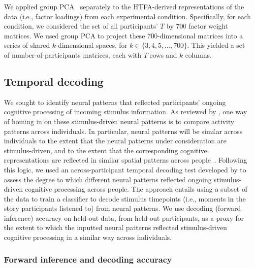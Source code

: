 \documentclass[english, 11pt]{article}
\begin{document}
We applied group PCA~\citep{SmitEtal14} separately to the HTFA-derived
representations of the data (i.e., factor loadings) from each experimental
condition. Specifically, for each condition, we considered the set of all
participants' $T$ by 700 factor weight matrices. We used group PCA to project
these 700-dimensional matrices into a series of shared $k$-dimensional spaces,
for $k \in \{3, 4, 5, ..., 700\}$. This yielded a set of number-of-participants
matrices, each with $T$ rows and $k$ columns.

\subsection*{Temporal decoding}

We sought to identify neural patterns that reflected participants' ongoing
cognitive processing of incoming stimulus information. As reviewed by
\cite{SimoEtal16}, one way of homing in on these stimulus-driven neural
patterns is to compare activity patterns across individuals. In particular,
neural patterns will be similar across individuals to the extent that the
neural patterns under consideration are stimulus-driven, and to the extent that
the corresponding cognitive representations are reflected in similar spatial
patterns across people~\citep{SimoChan20}. Following this logic, we used an
across-participant temporal decoding test developed by \cite{MannEtal18} to
assess the degree to which different neural patterns reflected ongoing
stimulus-driven cognitive processing across people. The approach entails using
a subset of the data to train a classifier to decode stimulus timepoints (i.e.,
moments in the story participants listened to) from neural patterns. We use
decoding (forward inference) accuracy on held-out data, from held-out
participants, as a proxy for the extent to which the inputted neural patterns
reflected stimulus-driven cognitive processing in a similar way across
individuals.

\subsubsection*{Forward inference and decoding accuracy}
\end{document}
